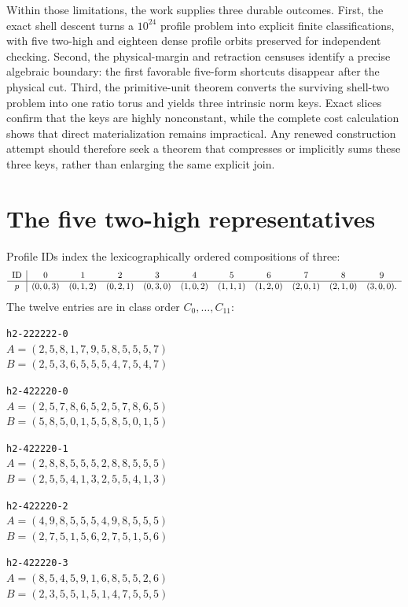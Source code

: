 \documentclass[11pt]{article}
\theoremstyle{remark}
\begin{document}
Within those limitations, the work supplies three durable outcomes.  First,
the exact shell descent turns a $10^{24}$ profile problem into explicit
finite classifications, with five two-high and eighteen dense profile
orbits preserved for independent checking.  Second, the physical-margin
and retraction censuses identify a precise algebraic boundary: the first
favorable five-form shortcuts disappear after the physical cut.  Third, the
primitive-unit theorem converts the surviving shell-two problem into one
ratio torus and yields three intrinsic norm keys.  Exact slices confirm that
the keys are highly nonconstant, while the complete cost calculation shows
that direct materialization remains impractical.  Any renewed construction
attempt should therefore seek a theorem that compresses or implicitly sums
these three keys, rather than enlarging the same explicit join.

\appendix
\section{The five two-high representatives}
\label{app:five}

Profile IDs index the lexicographically ordered compositions of three:
\[
\small
\begin{array}{c|cccccccccc}
\text{ID}&0&1&2&3&4&5&6&7&8&9\\
\hline
p&(0,0,3)&(0,1,2)&(0,2,1)&(0,3,0)&(1,0,2)&
(1,1,1)&(1,2,0)&(2,0,1)&(2,1,0)&(3,0,0).
\end{array}
\]
The twelve entries are in class order $C_0,\ldots,C_{11}$:

\begin{center}
\begin{minipage}{0.96\textwidth}\small
\texttt{h2-222222-0}\\
$A=(2,5,8,1,7,9,5,8,5,5,5,7)$\\
$B=(2,5,3,6,5,5,5,4,7,5,4,7)$

\medskip
\texttt{h2-422220-0}\\
$A=(2,5,7,8,6,5,2,5,7,8,6,5)$\\
$B=(5,8,5,0,1,5,5,8,5,0,1,5)$

\medskip
\texttt{h2-422220-1}\\
$A=(2,8,8,5,5,5,2,8,8,5,5,5)$\\
$B=(2,5,5,4,1,3,2,5,5,4,1,3)$

\medskip
\texttt{h2-422220-2}\\
$A=(4,9,8,5,5,5,4,9,8,5,5,5)$\\
$B=(2,7,5,1,5,6,2,7,5,1,5,6)$

\medskip
\texttt{h2-422220-3}\\
$A=(8,5,4,5,9,1,6,8,5,5,2,6)$\\
$B=(2,3,5,5,1,5,1,4,7,5,5,5)$
\end{minipage}
\end{center}
\end{document}
